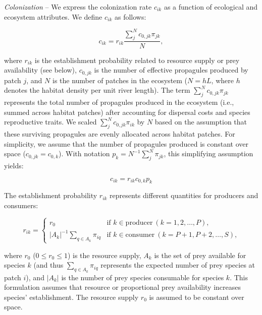 \documentclass[11pt, class=article, crop=false]{standalone}
\theoremstyle{definition}
\begin{document}
\textit{Colonization} --
We express the colonization rate $c_{ik}$ as a function of ecological and ecosystem attributes.
We define $c_{ik}$ as follows:

\begin{equation}
    c_{ik} = r_{ik} \frac{\sum_{j}^N c_{0, jk} \pi_{jk}}{N},
    \label{eq:clnz}
\end{equation}

where $r_{ik}$ is the establishment probability related to resource supply or prey availability (see below), $c_{0, jk}$ is the number of effective propagules produced by patch $j$, and $N$ is the number of patches in the ecosystem ($N = hL$, where $h$ denotes the habitat density per unit river length).
The term $\sum_{j}^N c_{0, jk} \pi_{jk}$ represents the total number of propagules produced in the ecosystem (i.e., summed across habitat patches) after accounting for dispersal costs and species reproductive traits.
We scaled $\sum_{j}^N c_{0, jk} \pi_{ik}$ by $N$ based on the assumption that these surviving propagules are evenly allocated across habitat patches.
For simplicity, we assume that the number of propagules produced is constant over space ($c_{0, jk} = c_{0, k}$).
With notation $p_k = N^{-1}\sum_{j}^N \pi_{jk}$, this simplifying assumption yields:

\begin{equation}
     c_{ik} = r_{ik} c_{0, k} p_k
\end{equation}

The establishment probability $r_{ik}$ represents different quantities for producers and consumers:

\begin{equation}
    r_{ik} =
    \begin{cases}
    r_{0} & \text{if $k \in \text{producer}~(k = 1, 2, \ldots, P)$,}\\
    |A_k|^{-1} \sum_{q \in A_k} \pi_{iq} & \text{if $k \in \text{consumer}~(k = P + 1, P + 2, \ldots, S)$,}
    \end{cases}
    \label{eq:r-eq}
\end{equation}

where $r_0$ ($0 \le r_0 \le 1$) is the resource supply, $A_k$ is the set of prey available for species $k$ (and thus $\sum_{q  \in A_k} \pi_{iq}$ represents the expected number of prey species at patch $i$), and $|A_k|$ is the number of prey species consumable for species $k$.
This formulation assumes that resource or proportional prey availability increases species' establishment.
The resource supply $r_0$ is assumed to be constant over space.
\end{document}
